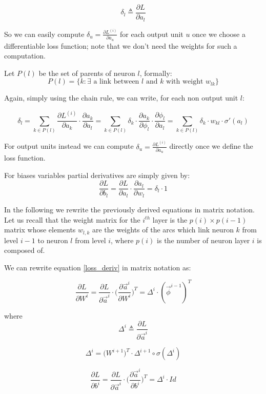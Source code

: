 \begin{equation}
\delta_l \triangleq \frac{\partial L}{\partial a_l}
\end{equation}



So we can easily compute $\delta_u = \frac{\partial L^{(i)}}{\partial a_u} $ for each output unit $u$ once we choose a differentiable loss function; note
that we don't need the weights for such a computation. 

Let $P(l)$ be the set of parents of neuron $l$, formally:
\begin{equation} 
P(l) = \{ k: \exists \text{ a link between $l$ and $k$ with weight } w_{lk} \}
\end{equation}

Again, simply using the chain rule, we can write, for each non output unit $l$:

\begin{equation}
\label{loss_deriv}
\delta_l = \sum_{k\in P(l)} \frac{\partial L^{(i)}}{\partial a_k} \cdot \frac{\partial a_k}{\partial a_l}= \sum_{k\in P(l)} \delta_k \cdot 
\frac{\partial a_k}{\partial \phi_l} \cdot \frac{\partial \phi_l}{\partial a_l} = \sum_{k\in P(l)} \delta_k \cdot 
w_{kl} \cdot \sigma'(a_l)
\end{equation}


For output units instead we can compute $\delta_u = \frac{\partial L^{(i)}}{\partial a_u} $ directly once we define the loss function.

For biases variables partial derivatives are simply given by:
$$\frac{\partial L}{\partial b_{l}}=\frac{\partial L}{\partial a_l} \cdot \frac{\partial a_l}{\partial w_{l}}=\delta_l \cdot 1$$




In the following we rewrite the previously derived equations in matrix notation.
Let us recall that the weight matrix for the $i^{th}$ layer is the $p(i) \times p(i-1)$ matrix whose elements $w_{l,k}$ are the weights of the arcs which link neuron $k$ from level $i-1$ to neuron $l$ from level $i$, where
$p(i)$ is the number of neuron layer $i$ is composed of.


We can rewrite equation \ref{loss_deriv} in matrix notation as:

\begin{equation}
 \frac{\partial L}{\partial W^i} = \frac{\partial L}{\partial \vec{a}^{i}} \cdot\Big(\frac{\partial \vec{a}^{i}}{\partial W^i}\Big)^T =
 \Delta^i \cdot (\vec{\phi}^{i-1})^T
\end{equation}

where
\begin{equation}
\Delta^i  \triangleq  \frac{\partial L}{\partial \vec{a}^{i}} 
\end{equation}

\begin{equation}
 \Delta^i = \big(W^{i+1}\big)^T \cdot \Delta^{i+1} \circ \sigma(\Delta^i)
\end{equation} 

\begin{equation}
 \frac{\partial L}{\partial b^i} = \frac{\partial L}{\partial \vec{a}^{i}} \cdot\Big(\frac{\partial \vec{a}^{i}}{\partial b^i}\Big)^T =
 \Delta^i \cdot Id
\end{equation}
